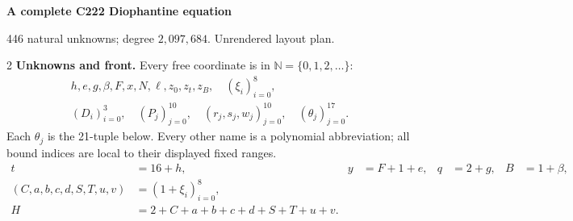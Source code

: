 \documentclass[10pt,letterpaper]{article}
\newcommand{\NN}{\mathbb N}
\begin{document}
\fontsize{9}{10.2}\selectfont
\begin{center}
{\fontsize{11}{12}\selectfont\bfseries A complete C222 Diophantine equation}\par
446 natural unknowns; degree $2{,}097{,}684$. Unrendered layout plan.
\end{center}
\vspace{-4pt}
\begin{multicols}{2}
\textbf{Unknowns and front.} Every free coordinate is in
$\NN=\{0,1,2,\ldots\}$:
\[
\begin{gathered}
h,e,g,\beta,F,x,N,\ell,z_0,z_t,z_B,\quad(\xi_i)_{i=0}^8,\\
(D_i)_{i=0}^3,\quad(P_j)_{j=0}^{10},\quad
(r_j,s_j,w_j)_{j=0}^{10},\quad(\theta_j)_{j=0}^{17}.
\end{gathered}
\]
Each $\theta_j$ is the 21-tuple below. Every other name is a polynomial
abbreviation; all bound indices are local to their displayed fixed ranges.
\[
\begin{aligned}
t&=16+h,&y&=F+1+e,&q&=2+g,&B&=1+\beta,\\
(C,a,b,c,d,S,T,u,v)&=(1+\xi_i)_{i=0}^8,\\
H&=2+C+a+b+c+d+S+T+u+v.
\end{aligned}
\]


\end{multicols}
\end{document}
